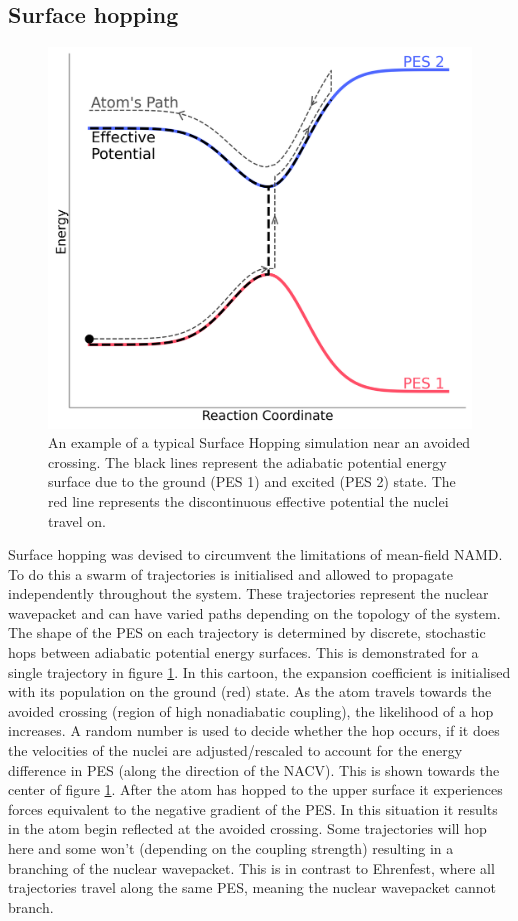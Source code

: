 \subsection{Surface hopping}
\begin{figure}[htp]
  \includegraphics[width=\textwidth]{./img/SH_hop.png}
  \caption{\label{fig:SH_diag}An example of a typical Surface Hopping simulation near an avoided crossing. The black lines represent the adiabatic potential energy surface due to the ground (PES 1) and excited (PES 2) state. The red line represents the discontinuous effective potential the nuclei travel on.}
\end{figure}
Surface hopping was devised to circumvent the limitations of mean-field NAMD. To do this a swarm of trajectories is initialised and allowed to propagate independently throughout the system. These trajectories represent the nuclear wavepacket and can have varied paths depending on the topology of the system. The shape of the PES on each trajectory is determined by discrete, stochastic hops between adiabatic potential energy surfaces. This is demonstrated for a single trajectory in figure \ref{fig:SH_diag}. In this cartoon, the expansion coefficient is initialised with its population on the ground (red) state. As the atom travels towards the avoided crossing (region of high nonadiabatic coupling), the likelihood of a hop increases. A random number is used to decide whether the hop occurs, if it does the velocities of the nuclei are adjusted/rescaled to account for the energy difference in PES (along the direction of the NACV). This is shown towards the center of figure \ref{fig:SH_diag}. After the atom has hopped to the upper surface it experiences forces equivalent to the negative gradient of the PES. In this situation it results in the atom begin reflected at the avoided crossing. Some trajectories will hop here and some won't (depending on the coupling strength) resulting in a branching of the nuclear wavepacket. This is in contrast to Ehrenfest, where all trajectories travel along the same PES, meaning the nuclear wavepacket cannot branch.
